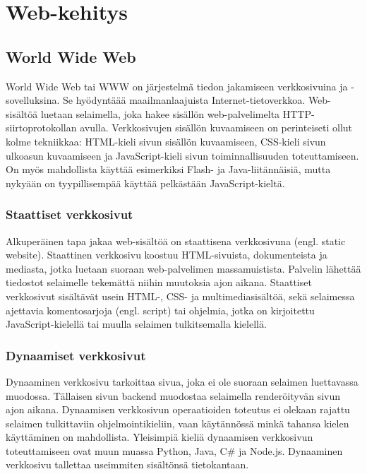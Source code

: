 \chapter{Web-kehitys}

\section{World Wide Web}
World Wide Web tai WWW on järjestelmä tiedon jakamiseen verkkosivuina ja -sovelluksina. Se hyödyntäää maailmanlaajuista
Internet-tietoverkkoa. Web-sisältöä luetaan selaimella, joka hakee sisällön web-palvelimelta HTTP-siirtoprotokollan
avulla. Verkkosivujen sisällön kuvaamiseen on perinteiseti ollut kolme tekniikkaa: HTML-kieli sivun sisällön
kuvaamiseen, CSS-kieli sivun ulkoasun kuvaamiseen ja JavaScript-kieli sivun toiminnallisuuden toteuttamiseen. On myös
mahdollista käyttää esimerkiksi Flash- ja Java-liitännäisiä, mutta nykyään on tyypillisempää käyttää pelkästään
JavaScript-kieltä. \cite{javascriptguide}

\subsection{Staattiset verkkosivut}
Alkuperäinen tapa jakaa web-sisältöä on staattisena verkkosivuna (engl. static website). Staattinen verkkosivu koostuu
HTML-sivuista, dokumenteista ja mediasta, jotka luetaan suoraan web-palvelimen massamuistista. Palvelin lähettää
tiedostot selaimelle tekemättä niihin muutoksia ajon aikana. Staattiset verkkosivut sisältävät usein HTML-, CSS- ja
multimediasisältöä, sekä selaimessa ajettavia komentosarjoja (engl. script) tai ohjelmia, jotka on kirjoitettu
JavaScript-kielellä tai muulla selaimen tulkitsemalla kielellä. \cite{staticdynamicwebsites}

\subsection{Dynaamiset verkkosivut}
Dynaaminen verkkosivu tarkoittaa sivua, joka ei ole suoraan selaimen luettavassa muodossa. Tällaisen sivun backend
muodostaa selaimella renderöityvän sivun ajon aikana. Dynaamisen verkkosivun operaatioiden toteutus ei olekaan rajattu
selaimen tulkittaviin ohjelmointikieliin, vaan käytännössä minkä tahansa kielen käyttäminen on mahdollista. Yleisimpiä
kieliä dynaamisen verkkosivun toteuttamiseen ovat muun muassa Python, Java, C\# ja Node.js. Dynaaminen verkkosivu
tallettaa useimmiten sisältönsä tietokantaan. \cite{staticdynamicwebsites}

